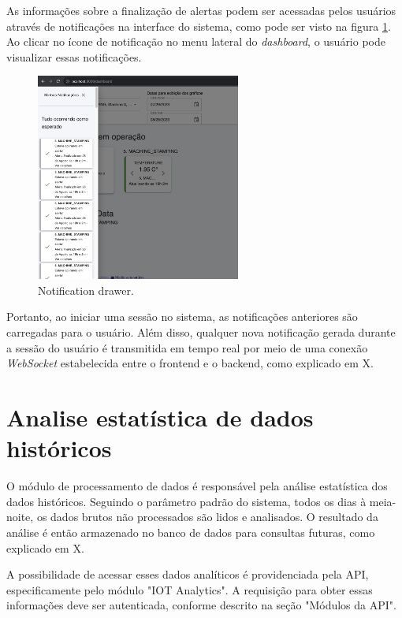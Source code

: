 As informações sobre a finalização de alertas podem ser acessadas pelos usuários através de notificações na interface do sistema, como pode ser visto na figura \ref{fig:notificationDrawer}. Ao clicar no ícone de notificação no menu lateral do \textit{dashboard}, o usuário pode visualizar essas notificações.

\begin{figure}[htbp]
	\centering
	\includegraphics[width=0.6\textwidth]{images/notification.png}
	\caption{Notification drawer.}
	\label{fig:notificationDrawer}
\end{figure}


Portanto, ao iniciar uma sessão no sistema, as notificações anteriores são carregadas para o usuário. Além disso, qualquer nova notificação gerada durante a sessão do usuário é transmitida em tempo real por meio de uma conexão \textit{WebSocket} estabelecida entre o frontend e o backend, como explicado em X.%


\section[Analise estatística de dados históricos]{Analise estatística de dados históricos}\label{sec:histicalGraphs}

O módulo de processamento de dados é responsável pela análise estatística dos dados históricos. Seguindo o parâmetro padrão do sistema, todos os dias à meia-noite, os dados brutos não processados são lidos e analisados. O resultado da análise é então armazenado no banco de dados para consultas futuras, como explicado em X. %

A possibilidade de acessar esses dados analíticos é providenciada pela \gls{API}, especificamente pelo módulo "IOT Analytics". A requisição para obter essas informações deve ser autenticada, conforme descrito na seção "Módulos da API".%

